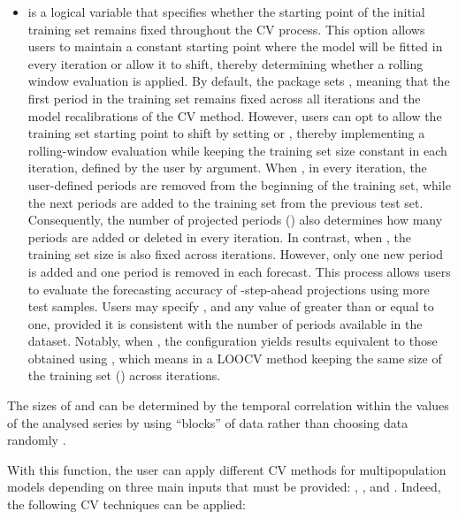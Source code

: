 \begin{itemize}
\item {} is a logical variable that specifies whether the starting point of the initial training set remains fixed throughout the CV process. This option allows users to maintain a constant starting point where the model will be fitted in every iteration or allow it to shift, thereby determining whether a rolling window evaluation is applied. By default, the package sets , meaning that the first period in the training set remains fixed across all iterations and the model recalibrations of the CV method. However, users can opt to allow the training set starting point to shift by setting  or {}, thereby implementing a rolling-window evaluation while keeping the training set size constant in each iteration, {defined by the user by  argument.} When , in every iteration, the user-defined  periods are removed from the beginning of the training set, {while the next  periods are added to the training set from the previous test set. Consequently, the number of projected periods () also determines how many periods are added or deleted in every iteration.} In contrast, {when , the training set size is also fixed across iterations. However, only one new period is added and one period is removed in each forecast. This process allows users to evaluate the forecasting accuracy of -step-ahead projections using more test samples. Users may specify , and any value of  greater than or equal to one, provided it is consistent with the number of periods available in the dataset. Notably,  when , the configuration  yields results equivalent to those obtained using , which means in a LOOCV method keeping the same size of the training set () across iterations.}
\end{itemize}

The sizes of  and  can be determined by the temporal correlation within the values of the analysed series by using ``blocks'' of data rather than choosing data randomly \citep{Racine2000, Berg2012}.

With this function, the user can apply different CV methods for multipopulation models depending on three main inputs that must be provided: , , and . Indeed, the following CV techniques can be applied:

